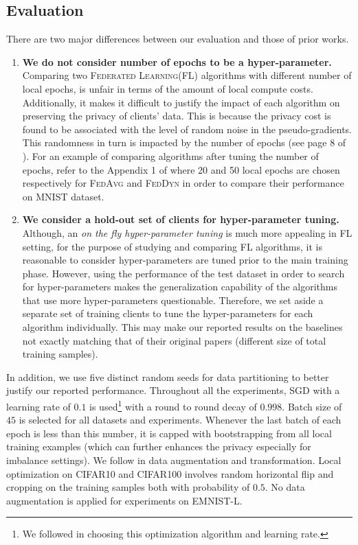 \documentclass[runningheads]{llncs}
\newcommand{\fl}{\textsc{Federated Learning}\xspace}
\newcommand{\fedavg}{\textsc{FedAvg}\xspace}
\newcommand{\feddyn}{\textsc{FedDyn}\xspace}
\newcommand{\sgd}{\textsc{SGD}\xspace}
\def\cifart{{\textsc{CIFAR10}}}
\def\cifarh{{\textsc{CIFAR100}}}
\def\emnist{{\textsc{EMNIST-L}}}
\begin{document}
\subsection{Evaluation}
There are two major differences between our evaluation and those of prior works. 
\begin{enumerate}
    \item \textbf{We do not consider number of epochs to be a hyper-parameter.}
    Comparing two \fl (FL) algorithms with different number of local epochs,
    is unfair in terms of the amount of local compute costs. 
Additionally, it makes it difficult to justify the impact of each algorithm on
    preserving the privacy of clients' data.
This is because the privacy cost is found to be associated with the level of random
    noise in the pseudo-gradients.
This randomness in turn is impacted by the number of epochs (see page 8 of
    \cite{fowl2021robbing}).
For an example of comparing algorithms after tuning the number of epochs, refer to
    the Appendix 1 of \cite{acar2021federated} where 20 and 50 local epochs are
    chosen respectively for \fedavg and \feddyn in order to compare their
    performance on \textsc{MNIST} dataset. 
    
    \item \textbf{We consider a hold-out set of clients for hyper-parameter tuning.}
Although, an {\it on the fly hyper-parameter tuning} is much more appealing in
    FL setting, for the purpose of studying and comparing FL
    algorithms, it is reasonable to consider hyper-parameters are tuned prior to the
    main training phase.
However, using the performance of the test dataset in order to search for
    hyper-parameters makes the generalization capability of the algorithms that use
    more hyper-parameters questionable.
Therefore, we set aside a separate set of training clients to tune the
    hyper-parameters for each algorithm individually.
This may make our reported results on the baselines not exactly matching that of
    their original papers (different size of total training samples).
\end{enumerate}
In addition, we use five distinct random seeds for data partitioning to better justify
our reported performance.
Throughout all the experiments, \sgd with a learning rate of $0.1$ is
used\footnote{We followed \cite{acar2021federated} in choosing this optimization
algorithm and learning rate.} with a round to round decay of $0.998$.
Batch size of $45$ is selected for all datasets and experiments.
Whenever the last batch of each epoch is less than this number, it is capped with
bootstrapping from all local training examples (which can further enhances the privacy
especially for imbalance settings).
We follow \cite{acar2021federated} in data augmentation and transformation.
Local optimization on \cifart{} and \cifarh{} involves random horizontal
flip and cropping on the training samples both with probability of $0.5$.
No data augmentation is applied for experiments on \emnist{}.
\end{document}
